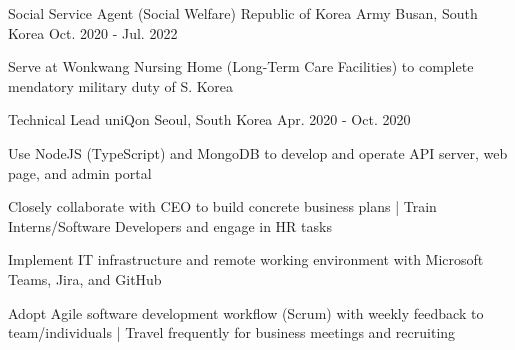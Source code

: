 

\begin{cventries}

  \cventry
  {Social Service Agent (Social Welfare)} %
  {Republic of Korea Army} %
  {Busan, South Korea} %
  {Oct. 2020 - Jul. 2022} %
  {
    \begin{cvitems} %
      \item {Serve at Wonkwang Nursing Home (Long-Term Care Facilities) to complete mendatory military duty of S. Korea}
    \end{cvitems}
  }

  \cventry
  {Technical Lead} %
  {uniQon} %
  {Seoul, South Korea} %
  {Apr. 2020 - Oct. 2020} %
  {
    \begin{cvitems} %
      \item {Use NodeJS (TypeScript) and MongoDB to develop and operate API server, web page, and admin portal}
      \item {Closely collaborate with CEO to build concrete business plans | Train Interns/Software Developers and engage in HR tasks}
      \item {Implement IT infrastructure and remote working environment with Microsoft Teams, Jira, and GitHub}
      \item {Adopt Agile software development workflow (Scrum) with weekly feedback to team/individuals | Travel frequently for business meetings and recruiting}
    \end{cvitems}
  }


\end{cventries}
